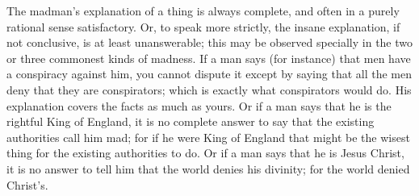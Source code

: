\documentclass{book}
\begin{document}
The madman’s explanation of a thing is always complete, and often in a purely rational sense satisfactory. Or, to speak more strictly, the insane explanation, if not conclusive, is at least unanswerable; this may be observed specially in the two or three commonest kinds of madness. If a man says (for instance) that men have a conspiracy against him, you cannot dispute it except by saying that all the men deny that they are conspirators; which is exactly what conspirators would do. His explanation covers the facts as much as yours. Or if a man says that he is the rightful King of England, it is no complete answer to say that the existing authorities call him mad; for if he were King of England that might be the wisest thing for the existing authorities to do. Or if a man says that he is Jesus Christ, it is no answer to tell him that the world denies his divinity; for the world denied Christ’s.
\end{document}
